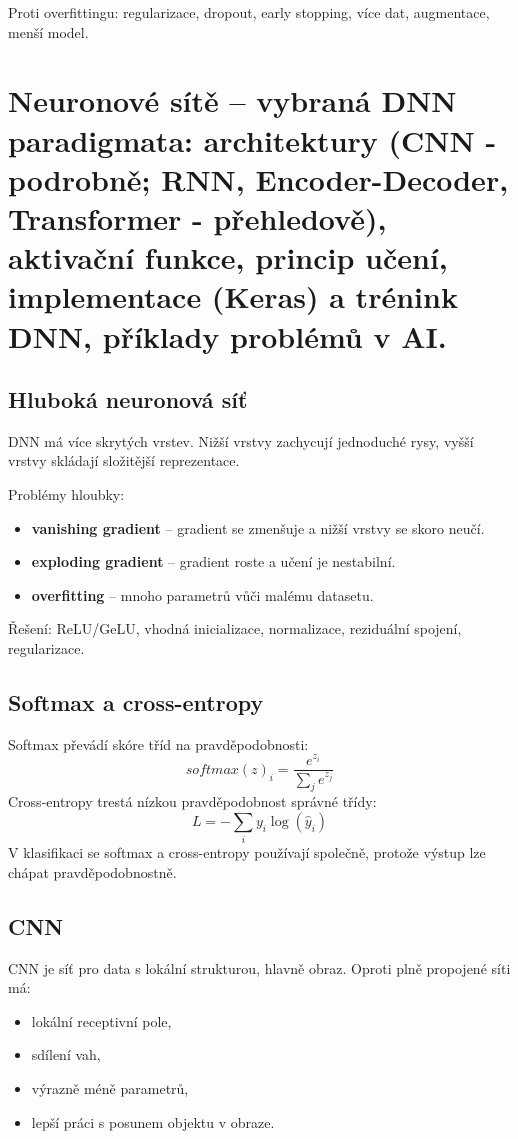 Proti overfittingu: regularizace, dropout, early stopping, více dat,
augmentace, menší model.

\section{Neuronové sítě – vybraná DNN paradigmata: architektury (CNN - podrobně; RNN, Encoder-Decoder, Transformer - přehledově), aktivační funkce, princip učení, implementace (Keras) a trénink DNN, příklady problémů v AI.}

\subsection*{Hluboká neuronová síť}
DNN má více skrytých vrstev. Nižší vrstvy zachycují jednoduché rysy, vyšší
vrstvy skládají složitější reprezentace.

Problémy hloubky:
\begin{itemize}
    \item \textbf{vanishing gradient} -- gradient se zmenšuje a nižší vrstvy se skoro neučí.
    \item \textbf{exploding gradient} -- gradient roste a učení je nestabilní.
    \item \textbf{overfitting} -- mnoho parametrů vůči malému datasetu.
\end{itemize}

Řešení: ReLU/GeLU, vhodná inicializace, normalizace, reziduální spojení, regularizace.

\subsection*{Softmax a cross-entropy}
Softmax převádí skóre tříd na pravděpodobnosti:
\begin{equation}
    softmax(z)_i=\frac{e^{z_i}}{\sum_j e^{z_j}}
\end{equation}
Cross-entropy trestá nízkou pravděpodobnost správné třídy:
\begin{equation}
    L=-\sum_i y_i\log(\hat y_i)
\end{equation}
V klasifikaci se softmax a cross-entropy používají společně, protože výstup lze
chápat pravděpodobnostně.

\subsection*{CNN}
CNN je síť pro data s lokální strukturou, hlavně obraz. Oproti plně propojené
síti má:
\begin{itemize}
    \item lokální receptivní pole,
    \item sdílení vah,
    \item výrazně méně parametrů,
    \item lepší práci s posunem objektu v obraze.
\end{itemize}

